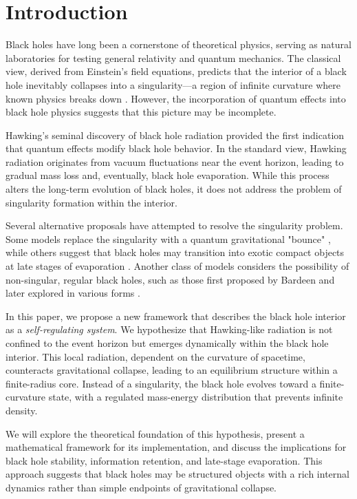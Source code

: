 \section{Introduction}

Black holes have long been a cornerstone of theoretical physics, serving as natural laboratories for testing general relativity and quantum mechanics. The classical view, derived from Einstein’s field equations, predicts that the interior of a black hole inevitably collapses into a singularity—a region of infinite curvature where known physics breaks down \cite{penrose1965singularity}. However, the incorporation of quantum effects into black hole physics suggests that this picture may be incomplete.

Hawking’s seminal discovery of black hole radiation \cite{hawking1975particle} provided the first indication that quantum effects modify black hole behavior. In the standard view, Hawking radiation originates from vacuum fluctuations near the event horizon, leading to gradual mass loss and, eventually, black hole evaporation. While this process alters the long-term evolution of black holes, it does not address the problem of singularity formation within the interior.

Several alternative proposals have attempted to resolve the singularity problem. Some models replace the singularity with a quantum gravitational "bounce" \cite{bojowald2005nonsingular}, while others suggest that black holes may transition into exotic compact objects at late stages of evaporation \cite{frolov2017information}. Another class of models considers the possibility of non-singular, regular black holes, such as those first proposed by Bardeen \cite{bardeen1968non} and later explored in various forms \cite{hayward2006formation}.

In this paper, we propose a new framework that describes the black hole interior as a \textit{self-regulating system}. We hypothesize that Hawking-like radiation is not confined to the event horizon but emerges dynamically within the black hole interior. This local radiation, dependent on the curvature of spacetime, counteracts gravitational collapse, leading to an equilibrium structure within a finite-radius core. Instead of a singularity, the black hole evolves toward a finite-curvature state, with a regulated mass-energy distribution that prevents infinite density.

We will explore the theoretical foundation of this hypothesis, present a mathematical framework for its implementation, and discuss the implications for black hole stability, information retention, and late-stage evaporation. This approach suggests that black holes may be structured objects with a rich internal dynamics rather than simple endpoints of gravitational collapse.

